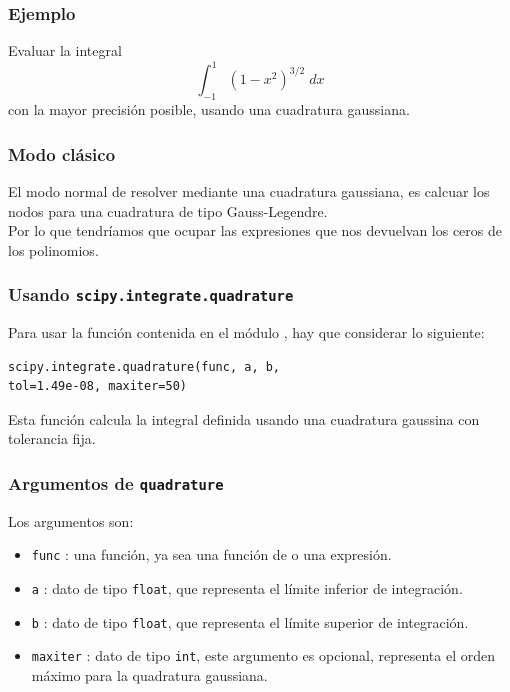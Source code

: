 \begin{frame}
\frametitle{Ejemplo}
Evaluar la integral
\[ \int_{-1}^{1} (1 - x^{2})^{3/2} \; dx \]
con la mayor precisión posible, usando una cuadratura gaussiana.
\end{frame}
\begin{frame}
\frametitle{Modo clásico}
El modo normal de resolver mediante una cuadratura gaussiana, es calcuar los nodos para una cuadratura de tipo Gauss-Legendre.
\\
\bigskip
Por lo que tendríamos que ocupar las expresiones que nos devuelvan los ceros de los polinomios. 
\end{frame}
\begin{frame}[fragile]
\frametitle{Usando \texttt{scipy.integrate.quadrature}}
Para usar la función  contenida en el módulo , hay que considerar lo siguiente:
\begin{verbatim}
scipy.integrate.quadrature(func, a, b, 
tol=1.49e-08, maxiter=50)
\end{verbatim}
\pause
Esta función calcula la integral definida usando una cuadratura gaussina con tolerancia fija.
\end{frame}
\begin{frame}
\frametitle{Argumentos de \texttt{quadrature}}
Los argumentos son:
\begin{itemize}
\item \texttt{func} : una función, ya sea una función de \python{} o una expresión.
\item \texttt{a} : dato de tipo \texttt{float}, que representa el límite inferior de integración.
\item \texttt{b} : dato de tipo \texttt{float}, que representa el límite superior de integración.
\item \texttt{maxiter} : dato de tipo \texttt{int}, este argumento es opcional, representa el orden máximo para la quadratura gaussiana.
\end{itemize}
\end{frame}

